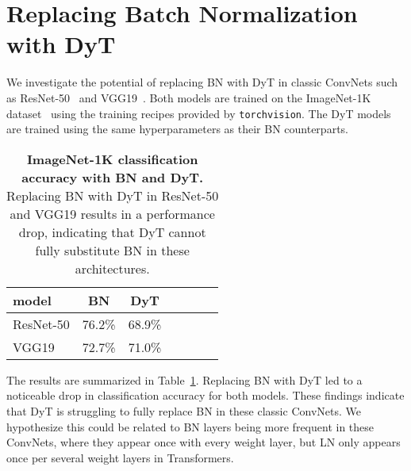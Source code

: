 \documentclass[]{fairmeta}
\newcommand{\tablestyle}[2]{\setlength{\tabcolsep}{#1}\renewcommand{\arraystretch}{#2}\centering\footnotesize}
\begin{document}
\section{Replacing Batch Normalization with DyT}
\label{section:batch_normalization}

We investigate the potential of replacing BN with DyT in classic ConvNets such as ResNet-50~\citep{he2016deep} and VGG19~\citep{simonyan2014very}.
Both models are trained on the ImageNet-1K dataset~\citep{deng2009imagenet} using the training recipes provided by \texttt{torchvision}. The DyT models are trained using the same hyperparameters as their BN counterparts.

\begin{table}[h]
\centering
\tablestyle{7pt}{1.15}
\begin{tabular}{lcccccc}
\toprule
model & BN & DyT \\
\midrule
ResNet-50 & 76.2\% & 68.9\% \\
VGG19   & 72.7\% & 71.0\% \\
\midrule
\end{tabular}
\caption{\textbf{ImageNet-1K classification accuracy with BN and DyT.} Replacing BN with DyT in ResNet-50 and VGG19 results in a performance drop, indicating that DyT cannot fully substitute BN in these architectures.}
\label{table:bn_ablation}
\end{table}

The results are summarized in Table~\ref{table:bn_ablation}. Replacing BN with DyT led to a noticeable drop in classification accuracy for both models. These findings indicate that DyT is struggling to fully replace BN in these classic ConvNets. We hypothesize this could be related to BN layers being more frequent in these ConvNets, where they appear once with every weight layer, but LN only appears once per several weight layers in Transformers. 
\end{document}
